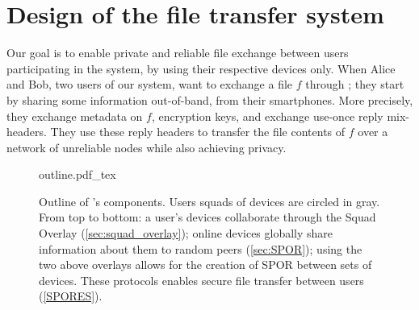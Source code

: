 \section{Design of the \name file transfer system}%
\label{design}

Our goal is to enable private and reliable file exchange between users 
participating in the system, by using their respective devices only.
When Alice and Bob, two users of our system, want to exchange a file \(f\) 
through \name; they start by sharing some information out-of-band, \eg from 
their smartphones.
More precisely, they exchange metadata on \(f\), encryption keys, and exchange 
use-once reply mix-headers.
They use these reply headers to transfer the file contents of \(f\) over a 
network of unreliable nodes while also achieving privacy.

\begin{figure}[t]
  \centering
  \def\svgwidth{0.8\columnwidth}
  {outline.pdf_tex}
  \caption{\label{fig:outline}%
    Outline of \name's components. Users squads of devices are circled in gray. 
    From top to bottom: a user's devices collaborate through the Squad Overlay 
    (\cref{sec:squad_overlay}); online devices globally share information about 
    them to random peers (\cref{sec:SPOR}); using the two above 
    overlays allows for the creation of \ac{SPOR} between sets of devices. 
    These protocols enables secure file transfer between users 
    (\cref{SPORES}).}
\end{figure}

